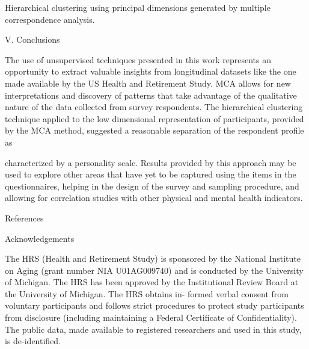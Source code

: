 \documentclass[]{article}
\begin{document}
Hierarchical clustering using principal dimensions generated by multiple
correspondence analysis.

V. Conclusions

The use of unsupervised techniques presented in this work represents an
opportunity to extract valuable insights from longitudinal datasets like
the one made available by the US Health and Retirement Study. MCA allows
for new interpretations and discovery of patterns that take advantage of
the qualitative nature of the data collected from survey respondents.
The hierarchical clustering technique applied to the low dimensional
representation of participants, provided by the MCA method, suggested a
reasonable separation of the respondent profile as

characterized by a personality scale. Results provided by this approach
may be used to explore other areas that have yet to be captured using
the items in the questionnaires, helping in the design of the survey and
sampling procedure, and allowing for correlation studies with other
physical and mental health indicators.

References

Acknowledgements

The HRS (Health and Retirement Study) is sponsored by the National
Institute on Aging (grant number NIA U01AG009740) and is conducted by
the University of Michigan. The HRS has been approved by the
Institutional Review Board at the University of Michigan. The HRS
obtains in- formed verbal consent from voluntary participants and
follows strict procedures to protect study participants from disclosure
(including maintaining a Federal Certificate of Confidentiality). The
public data, made available to registered researchers and used in this
study, is de-identified.
\end{document}
